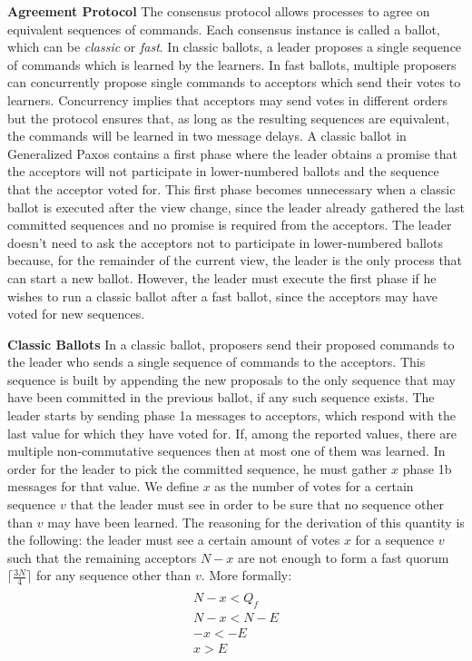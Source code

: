 \textbf{Agreement Protocol} The consensus protocol allows processes to agree on equivalent sequences of commands. Each consensus instance is called a ballot, which can be \textit{classic} or \textit{fast}. In classic ballots, a leader proposes a single sequence of commands which is learned by the learners. In fast ballots, multiple proposers can concurrently propose single commands to acceptors which send their votes to learners. Concurrency implies that acceptors may send votes in different orders but the protocol ensures that, as long as the resulting sequences are equivalent, the commands will be learned in two message delays. A classic ballot in Generalized Paxos contains a first phase where the leader obtains a promise that the acceptors will not participate in lower-numbered ballots and the sequence that the acceptor voted for. This first phase becomes unnecessary when a classic ballot is executed after the view change, since the leader already gathered the last committed sequences and no promise is required from the acceptors. The leader doesn't need to ask the acceptors not to participate in lower-numbered ballots because, for the remainder of the current view, the leader is the only process that can start a new ballot.  However, the leader must execute the first phase if he wishes to run a classic ballot after a fast ballot, since the acceptors may have voted for new sequences. \par
\textbf{Classic Ballots} In a classic ballot, proposers send their proposed commands to the leader who sends a single sequence of commands to the acceptors. This sequence is built by appending the new proposals to the only sequence that may have been committed in the previous ballot, if any such sequence exists. The leader starts by sending phase 1a messages to acceptors, which respond with the last value for which they have voted for. If, among the reported values, there are multiple non-commutative sequences then at most one of them was learned. In order for the leader to pick the committed sequence, he must gather $x$ phase 1b messages for that value. We define $x$ as the number of votes for a certain sequence $v$ that the leader must see in order to be sure that no sequence other than $v$ may have been learned. The reasoning for the derivation of this quantity is the following: the leader must see a certain amount of votes $x$ for a sequence $v$ such that the remaining acceptors $N-x$ are not enough to form a fast quorum $\lceil\frac{3N}{4}\rceil$ for any sequence other than $v$. More formally: 
\begin{gather*} \\
N - x < Q_f \label{eq_1} \tag{1} \\ 
N - x < N - E \label{eq_2} \tag{2} \\
-x < -E \label{eq_3} \tag{3} \\
x > E \label{eq_4} \tag{4} \\
\end{gather*}

